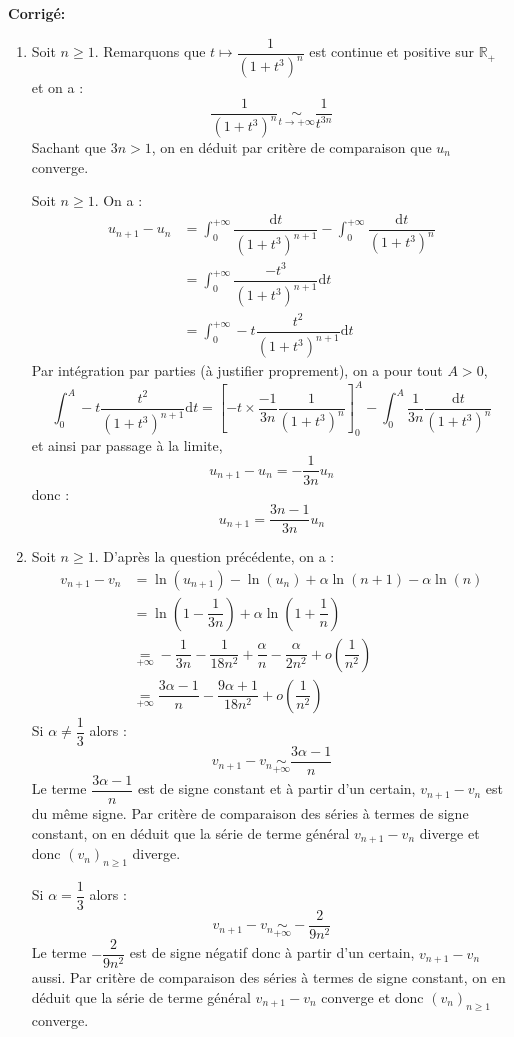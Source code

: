 \documentclass[a4paper,twoside,french,10pt]{VcCours}
\newcommand{\dt}{\text{d}t}
\newcommand{\corr}{\textbf{Corrigé:}}
\begin{document}
\corr \begin{enumerate}
\item Soit $n \geq 1$. Remarquons que $t \mapsto \dfrac{1}{(1+t^3)^n}$ est continue et positive sur $\mathbb{R}_+$ et on a :
$$ \dfrac{1}{(1+t^3)^n} \underset{t \rightarrow + \infty}{\sim} \dfrac{1}{t^{3n}}$$
Sachant que $3n>1$, on en déduit par critère de comparaison que $u_n$ converge.

\medskip

\noindent Soit $n \geq 1$. On a :
\begin{align*}
 u_{n+1} - u_n &  =  \int_{0}^{+ \infty} \dfrac{\dt}{(1+t^3)^{n+1}} -  \int_{0}^{+ \infty} \dfrac{\dt}{(1+t^3)^n} \\
 & = \int_{0}^{+ \infty} \dfrac{-t^3}{(1+t^3)^{n+1}} \dt \\
 & =  \int_{0}^{+ \infty} - t \dfrac{t^2}{(1+t^3)^{n+1}} \dt
\end{align*}
Par intégration par parties (à justifier proprement), on a pour tout $A>0$,
$$ \int_{0}^A  - t \dfrac{t^2}{(1+t^3)^{n+1}} \dt = \left[-t \times \dfrac{-1}{3n} \dfrac{1}{(1+t^3)^n} \right]_0^A -\int_{0}^A \dfrac{1}{3n} \dfrac{\dt}{(1+t^3)^n}$$
et ainsi par passage à la limite,
$$ u_{n+1}-u_n = -\dfrac{1}{3n} u_n$$
donc :
$$ u_{n+1} = \dfrac{3n-1}{3n} u_n$$

\item Soit $n \geq 1$. D'après la question précédente, on a :
\begin{align*}
v_{n+1}-v_n & = \ln(u_{n+1})- \ln(u_n) + \alpha \ln(n+1)- \alpha \ln(n) \\
& = \ln \left(1 - \dfrac{1}{3n} \right) + \alpha \ln \left(1 + \dfrac{1}{n} \right) \\
& \underset{+ \infty}{=} - \dfrac{1}{3n} - \dfrac{1}{18n^2} + \dfrac{\alpha}{n}- \dfrac{\alpha}{2n^2} + o \left( \dfrac{1}{n^2} \right) \\
& \underset{+ \infty}{=} \dfrac{3 \alpha-1}{n} - \dfrac{9\alpha+1}{18n^2}+ o \left( \dfrac{1}{n^2}\right)
\end{align*}
Si $\alpha \neq \dfrac{1}{3}$ alors :
$$ v_{n+1}-v_n \underset{+ \infty}{\sim} \dfrac{3 \alpha-1}{n}$$
Le terme $\dfrac{3 \alpha-1}{n}$ est de signe constant et à partir d'un certain, $v_{n+1}-v_n$ est du même signe. Par critère de comparaison des séries à termes de signe constant, on en déduit que la série de terme général $v_{n+1}-v_n$ diverge et donc $(v_n)_{n \geq 1}$ diverge. 

\medskip

\noindent Si $\alpha = \dfrac{1}{3}$ alors :
$$ v_{n+1}-v_n \underset{+ \infty}{\sim} - \dfrac{2}{9n^2} $$
Le terme $-\dfrac{2}{9n^2}$ est de signe négatif donc à partir d'un certain, $v_{n+1}-v_n$ aussi. Par critère de comparaison des séries à termes de signe constant, on en déduit que la série de terme général $v_{n+1}-v_n$ converge et donc $(v_n)_{n \geq 1}$ converge. 


\end{enumerate}
\end{document}
